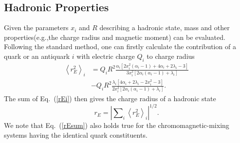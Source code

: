 \documentclass[12pt,prd,onecolumn,floatfix,nofootinbib]{revtex4}
\begin{document}
\subsection{Hadronic Properties}

Given the parameters $x_{i}$ and $R$ describing a hadronic state, mass and
other properties(e.g.,the charge radius and magnetic moment) can be evaluated. 
Following the standard method, one can firstly calculate the
contribution of a quark or an antiquark $i$ with electric charge $Q_{i}$ to
charge radius \cite{DeGrand:1975cf}
\begin{equation}
\begin{aligned} {\left\langle r_{E}^{2} \right\rangle}_{i}&= Q_{i}R^{2}
\frac{\alpha_{i}
\left[2x_{i}^{2}\left(\alpha_{i}-1\right)+4\alpha_{i}+2\lambda_{i}-3\right]}
{3x_{i}^{2} \left[2\alpha_{i}\left(\alpha_{i}-1\right)+\lambda_{i}\right]}
\\ &-Q_{i}R^{2} \frac{\lambda_{i}
\left[4\alpha_{i}+2\lambda_{i}-2x_{i}^{2}-3\right]} {2x_{i}^{2}
\left[2\alpha_{i}\left(\alpha_{i}-1\right)+\lambda_{i}\right]}. \end{aligned}
\label{rEi}
\end{equation}%
The sum of Eq.~(\ref{rEi}) then gives the charge radius of a hadronic state
\cite{Chodos:1974pn}
\begin{equation}
r_{E}={\left\vert \sum\nolimits_{i}{\left\langle r_{E}^{2}\right\rangle }%
_{i}\right\vert }^{1/2}.  \label{rEsum}
\end{equation}%
We note that Eq.~(\ref{rEsum}) also holds true for the chromomagnetic-mixing
systems having the identical quark constituents.
\end{document}
